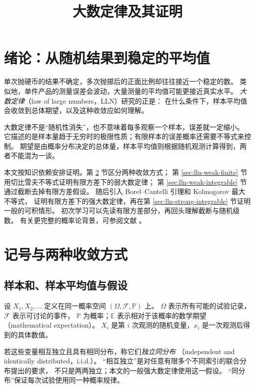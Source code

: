 \documentclass[UTF8,12pt,a4paper,fontset=fandol]{ctexart}
\title{大数定律及其证明}
\author{}
\date{}
\begin{document}
\maketitle
\tableofcontents

\section{绪论：从随机结果到稳定的平均值}
\label{sec:lln-introduction}

单次抛硬币的结果不确定，多次抛掷后的正面比例却往往接近一个稳定的数。
类似地，单件产品的测量误差会波动，大量测量的平均值可能更接近真实水平。
\emph{大数定律}（law of large numbers，LLN）研究的正是：
在什么条件下，样本平均值会收敛到总体期望，以及这种收敛应如何理解。

大数定律不是“随机性消失”，也不意味着每多观察一个样本，误差就一定缩小。
它描述的是样本量趋于无穷时的极限性质；有限样本的误差概率还需要不等式来控制。
期望是由概率分布决定的总体量，样本平均值则根据随机观测计算得到，两者不能混为一谈。

本文按知识依赖安排证明。第 \ref{sec:lln-convergence} 节区分两种收敛方式；
第 \ref{sec:lln-weak-finite} 节用切比雪夫不等式证明有限方差下的弱大数定律；
第 \ref{sec:lln-weak-integrable} 节通过截断去掉有限方差假设。
随后引入 Borel--Cantelli 引理和 Kolmogorov 最大不等式，
证明有限方差下的强大数定律，再在第 \ref{sec:lln-strong-integrable} 节证明一般的可积情形。
初次学习可以先读有限方差部分，再回头理解截断与随机级数。
有关更完整的概率论背景，可参阅文献 \cite{durrett-lln,sheffield-lln}。

\section{记号与两种收敛方式}
\label{sec:lln-convergence}

\subsection{样本和、样本平均值与假设}

设 $X_1,X_2,\ldots$ 定义在同一概率空间 $(\Omega,\mathcal F,\mathbb P)$ 上。
$\Omega$ 表示所有可能的试验记录，$\mathcal F$ 表示可讨论的事件，
$\mathbb P$ 为概率；$\mathbb E$ 表示相对于该概率的数学期望（mathematical expectation）。
$X_i$ 是第 $i$ 次观测的随机变量，$x_i$ 是一次观测后得到的具体数值。

若这些变量相互独立且具有相同分布，称它们\emph{独立同分布}
（independent and identically distributed，i.i.d.）。
“相互独立”是对任意有限多个不同索引的联合分布提出的要求，
不只是两两独立；本文的一般强大数定律使用这一假设。
“同分布”保证每次试验使用同一种概率规律。
\end{document}
